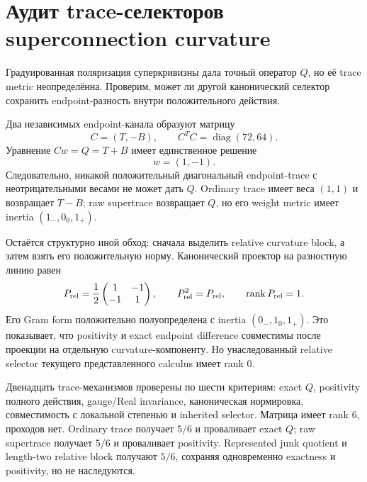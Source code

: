 \chapter{Аудит trace-селекторов superconnection curvature}
\label{ch:v10-h15-r2-superconnection-trace-selector-audit}

Градуированная поляризация суперкривизны дала точный оператор $Q$, но её
trace metric неопределённа. Проверим, может ли другой канонический селектор
сохранить endpoint-разность внутри положительного действия.

Два независимых endpoint-канала образуют матрицу
\begin{equation}
 C=(T,-B),\qquad C^TC=\operatorname{diag}(72,64).
\end{equation}
Уравнение $Cw=Q=T+B$ имеет единственное решение
\begin{equation}
 \boxed{w=(1,-1)}.
\end{equation}
Следовательно, никакой положительный диагональный endpoint-trace с
неотрицательными весами не может дать $Q$. Ordinary trace имеет веса
$(1,1)$ и возвращает $T-B$; raw supertrace возвращает $Q$, но его weight
metric имеет inertia $(1_-,0_0,1_+)$.

Остаётся структурно иной обход: сначала выделить relative curvature block,
а затем взять его положительную норму. Канонический проектор на разностную
линию равен
\begin{equation}
 P_{\rm rel}=\frac12
 \begin{pmatrix}1&-1\\-1&1\end{pmatrix},
 \qquad P_{\rm rel}^2=P_{\rm rel},
 \qquad \operatorname{rank} P_{\rm rel}=1.
\end{equation}
Его Gram form положительно полуопределена с inertia $(0_-,1_0,1_+)$. Это
показывает, что positivity и exact endpoint difference совместимы после
проекции на отдельную curvature-компоненту. Но унаследованный relative
selector текущего представленного calculus имеет rank $0$.

Двенадцать trace-механизмов проверены по шести критериям: exact $Q$,
positivity полного действия, gauge/Real invariance, каноническая
нормировка, совместимость с локальной степенью и inherited selector.
Матрица имеет rank $6$, проходов нет. Ordinary trace получает $5/6$ и
проваливает exact $Q$; raw supertrace получает $5/6$ и проваливает
positivity. Represented junk quotient и length-two relative block получают
$5/6$, сохраняя одновременно exactness и positivity, но не наследуются.

